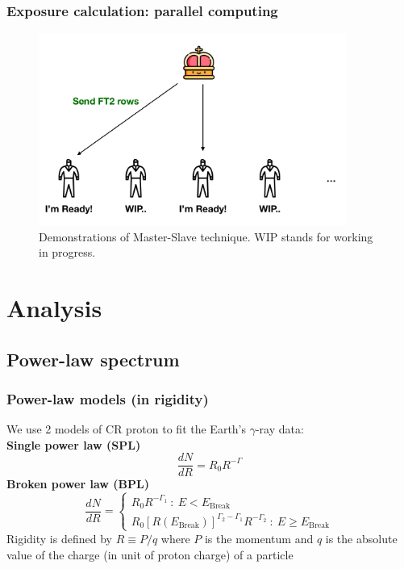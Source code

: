 \documentclass{beamer}
\begin{document}
\begin{frame}\frametitle{Exposure calculation: parallel computing}
  \begin{figure}[h!]
    \centering
    \includegraphics[width=0.9\textwidth]{figure/ms3.png}
    \caption{
      Demonstrations of Master-Slave technique. WIP stands for working in progress.
    }
  \end{figure}
\end{frame}


\section{Analysis}

\subsection{Power-law spectrum}

\begin{frame}
  \frametitle{Power-law models (in rigidity)}
  We use 2 models of CR proton to fit the Earth's $\gamma$-ray data: \\
  \textbf{Single power law (SPL)}
  \begin{equation*}
  \frac{dN}{dR} = R_0R^{-\Gamma}
  \end{equation*}
  \textbf{Broken power law (BPL)}
  \begin{equation*}
  \frac{dN}{dR}=
    \begin{cases}
      R_0R^{-\Gamma_1}\ :\ E < E_{\text{Break}}\\
      R_0[R(E_{\text{Break}})]^{\Gamma_2-\Gamma_1}R^{-\Gamma_2}\ :\ E \ge E_{\text{Break}}
    \end{cases}
  \end{equation*}
  Rigidity is defined by $R\equiv P/q$ where $P$ is the momentum and $q$ is the absolute value of the charge (in unit of proton charge) of a particle
\end{frame}
\end{document}
